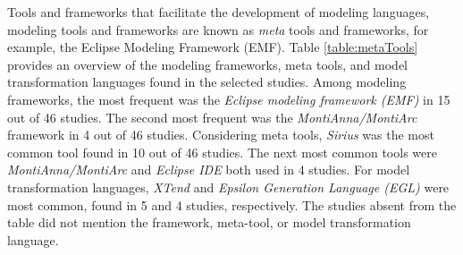 Tools and frameworks that facilitate the development of modeling languages, modeling tools and frameworks are known as \textit{meta} tools and frameworks, for example, the Eclipse Modeling Framework (EMF). Table \ref{table:metaTools} provides an overview of the modeling frameworks, meta tools, and model transformation languages found in the selected studies. Among modeling frameworks, the most frequent was the \textit{Eclipse modeling framework (EMF)} in 15 out of 46 studies. The second most frequent was the \textit{MontiAnna/MontiArc} framework in 4 out of 46 studies. Considering meta tools, \textit{Sirius} was the most common tool found in 10 out of 46 studies. The next most common tools were \textit{MontiAnna/MontiArc} and \textit{Eclipse IDE} both used in 4 studies. For model transformation languages, \textit{XTend} and \textit{Epsilon Generation Language (EGL)} were most common, found in 5 and 4 studies, respectively. The studies absent from the table did not mention the framework, meta-tool, or model transformation language.


